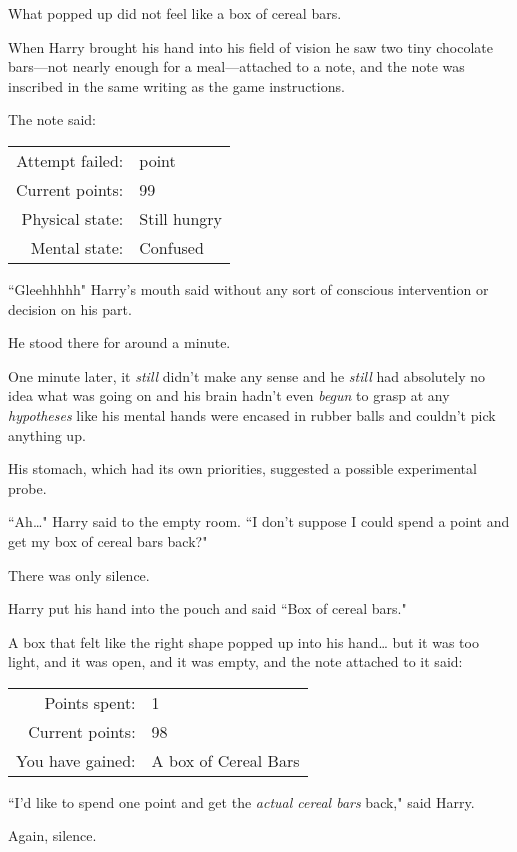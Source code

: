 What popped up did not feel like a box of cereal bars.

When Harry brought his hand into his field of vision he saw two tiny chocolate bars—not nearly enough for a meal—attached to a note, and the note was inscribed in the same writing as the game instructions.

The note said:
\begin{writtenNote}
\begin{tabular}{rl}
Attempt failed: & \minus1 point\\
Current points: & 99\\
Physical state: & Still hungry\\
Mental state: & Confused
\end{tabular}
\end{writtenNote}

``Gleehhhhh" Harry's mouth said without any sort of conscious intervention or decision on his part.

He stood there for around a minute.

One minute later, it \emph{still} didn't make any sense and he \emph{still} had absolutely no idea what was going on and his brain hadn't even \emph{begun} to grasp at any \emph{hypotheses} like his mental hands were encased in rubber balls and couldn't pick anything up.

His stomach, which had its own priorities, suggested a possible experimental probe.

``Ah{\ldots}" Harry said to the empty room. ``I don't suppose I could spend a point and get my box of cereal bars back?"

There was only silence.

Harry put his hand into the pouch and said ``Box of cereal bars."

A box that felt like the right shape popped up into his hand{\ldots} but it was too light, and it was open, and it was empty, and the note attached to it said:
\begin{writtenNote}
\begin{tabular}{rl}
Points spent: & 1\\
Current points: & 98\\
You have gained: & A box of Cereal Bars
\end{tabular}
\end{writtenNote}

``I'd like to spend one point and get the \emph{actual cereal bars} back," said Harry.

Again, silence.

